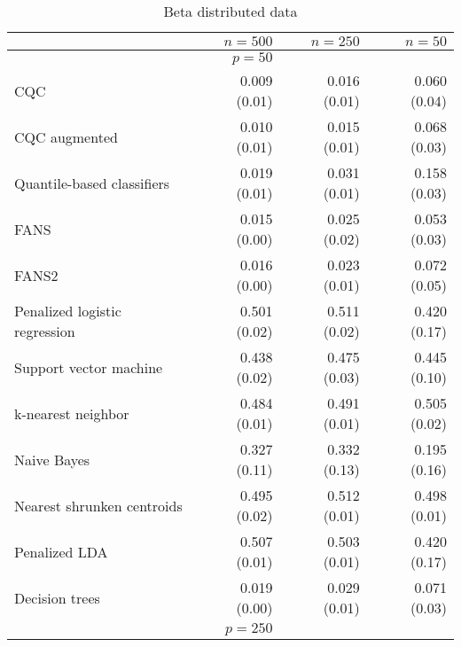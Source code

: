 \begin{table}[p]
  \centering
  \caption{Beta distributed data}
  \label{tab:beta}
  \vspace{5mm}
  
  \begin{adjustbox}{max size={\textwidth}{10cm}}
    \begin{tabular}{l@{\extracolsep{15mm}}rrr}
      
      \hline
      & $n=500$ & $n=250$ & $n=50$ \\ 
      \hline
      & $p = 50$ \\
      \hline

      CQC & 0.009 (0.01) & 0.016 (0.01) & 0.060 (0.04) \\ 
      CQC augmented & 0.010 (0.01) & 0.015 (0.01) & 0.068 (0.03) \\ 
      Quantile-based classifiers & 0.019 (0.01) & 0.031 (0.01) & 0.158 (0.03) \\ 
      FANS  & 0.015 (0.00) & 0.025 (0.02) & 0.053 (0.03) \\
      FANS2 & 0.016 (0.00) & 0.023 (0.01) & 0.072 (0.05) \\
      Penalized logistic regression & 0.501 (0.02) & 0.511 (0.02) & 0.420 (0.17) \\ 
      Support vector machine & 0.438 (0.02) & 0.475 (0.03) & 0.445 (0.10) \\ 
      k-nearest neighbor & 0.484 (0.01) & 0.491 (0.01) & 0.505 (0.02) \\ 
      Naive Bayes & 0.327 (0.11) & 0.332 (0.13) & 0.195 (0.16) \\ 
      Nearest shrunken centroids & 0.495 (0.02) & 0.512 (0.01) & 0.498 (0.01) \\ 
      Penalized LDA & 0.507 (0.01) & 0.503 (0.01) & 0.420 (0.17) \\ 
      Decision trees & 0.019 (0.00) & 0.029 (0.01) & 0.071 (0.03) \\ [2ex]

      \hline
      & $p = 250$ \\
      \hline


\end{tabular}
\end{adjustbox}
\end{table}
